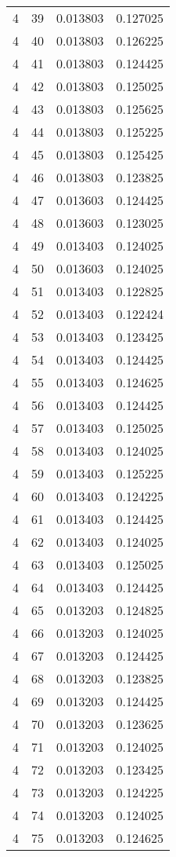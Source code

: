 \begin{longtable}{rrrr}
4 & 39 & 0.013803 & 0.127025 \\
4 & 40 & 0.013803 & 0.126225 \\
4 & 41 & 0.013803 & 0.124425 \\
4 & 42 & 0.013803 & 0.125025 \\
4 & 43 & 0.013803 & 0.125625 \\
4 & 44 & 0.013803 & 0.125225 \\
4 & 45 & 0.013803 & 0.125425 \\
4 & 46 & 0.013803 & 0.123825 \\
4 & 47 & 0.013603 & 0.124425 \\
4 & 48 & 0.013603 & 0.123025 \\
4 & 49 & 0.013403 & 0.124025 \\
4 & 50 & 0.013603 & 0.124025 \\
4 & 51 & 0.013403 & 0.122825 \\
4 & 52 & 0.013403 & 0.122424 \\
4 & 53 & 0.013403 & 0.123425 \\
4 & 54 & 0.013403 & 0.124425 \\
4 & 55 & 0.013403 & 0.124625 \\
4 & 56 & 0.013403 & 0.124425 \\
4 & 57 & 0.013403 & 0.125025 \\
4 & 58 & 0.013403 & 0.124025 \\
4 & 59 & 0.013403 & 0.125225 \\
4 & 60 & 0.013403 & 0.124225 \\
4 & 61 & 0.013403 & 0.124425 \\
4 & 62 & 0.013403 & 0.124025 \\
4 & 63 & 0.013403 & 0.125025 \\
4 & 64 & 0.013403 & 0.124425 \\
4 & 65 & 0.013203 & 0.124825 \\
4 & 66 & 0.013203 & 0.124025 \\
4 & 67 & 0.013203 & 0.124425 \\
4 & 68 & 0.013203 & 0.123825 \\
4 & 69 & 0.013203 & 0.124425 \\
4 & 70 & 0.013203 & 0.123625 \\
4 & 71 & 0.013203 & 0.124025 \\
4 & 72 & 0.013203 & 0.123425 \\
4 & 73 & 0.013203 & 0.124225 \\
4 & 74 & 0.013203 & 0.124025 \\
4 & 75 & 0.013203 & 0.124625 \\

\end{longtable}
